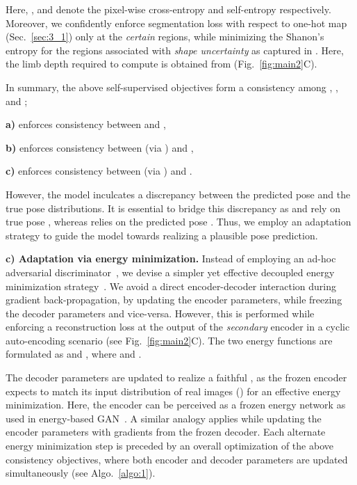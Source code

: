 Here, , and  denote the pixel-wise cross-entropy and self-entropy respectively. Moreover, we confidently enforce segmentation loss with respect to one-hot map  (Sec.~\ref{sec:3_1}) only at the \textit{certain} regions, while minimizing the Shanon's entropy for the regions associated with \textit{shape uncertainty} as captured in . Here, the limb depth required to compute  is obtained from  (Fig.~\ref{fig:main2}{\color{red}C}).

In summary, the above self-supervised objectives form a consistency among , , and ; 

\textbf{a)}  enforces consistency between  and , 

\textbf{b)}  enforces consistency between  (via ) and , 


\textbf{c)}  enforces consistency between  (via ) and . 

However, the model inculcates a discrepancy between the predicted pose and the true pose distributions. It is essential to bridge this discrepancy as  and  rely on true pose , whereas  relies on the predicted pose . Thus, we employ an adaptation strategy to guide the model towards realizing a plausible pose prediction.




\vspace{1mm}\noindent
\textbf{c) Adaptation via energy minimization.} 
Instead of employing an ad-hoc adversarial discriminator~\cite{chen2019unsupervised,yang20183d}, we devise a simpler yet effective decoupled energy minimization strategy~\cite{han2018co,jaderberg2017decoupled}. 
We avoid a direct encoder-decoder interaction during gradient back-propagation, by updating
the encoder parameters, while freezing the decoder parameters and vice-versa. However, this is performed while enforcing a reconstruction loss at the output of the \textit{secondary} encoder in a cyclic auto-encoding scenario (see Fig.~\ref{fig:main2}{\color{red}C}). The two energy functions are formulated as  and , where  and .

The decoder parameters are updated to realize a faithful , as the frozen encoder expects  to match its input distribution of real images (\ie ) for an effective energy minimization. Here, the encoder can be perceived as a frozen energy network as used in energy-based GAN~\cite{zhao2016energy}. A similar analogy applies while updating the encoder parameters with gradients from the frozen decoder. Each alternate energy minimization step is preceded by an overall optimization of the above consistency objectives, where both encoder and decoder parameters are updated simultaneously (see Algo.~\ref{algo:1}).